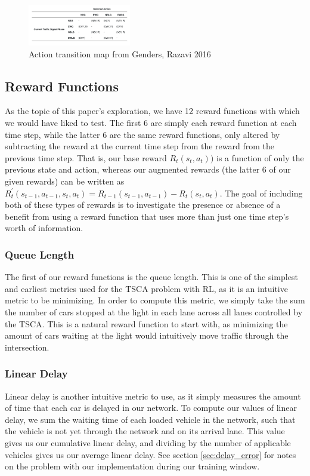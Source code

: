 \documentclass[12pt,twocolumn]{article}
\begin{document}
\begin{figure}
    \includegraphics[width=0.4\textwidth]{Figures/genders_actions}  
    \caption{Action transition map from Genders, Razavi 2016}
    \label{fig:action_transitions}
\end{figure}

\subsection{Reward Functions}
As the topic of this paper's exploration, we have 12 reward functions with which we would have liked to test. The first 6 are simply each reward function at each time step, while the latter 6 are the same reward functions, only altered by subtracting the reward at the current time step from the reward from the previous time step. That is, our base reward \(R_t(s_{t},a_{t}))\) is a function of only the previous state and action, whereas our augmented rewards (the latter 6 of our given rewards) can be written as \(R_t^{'}(s_{t-1},a_{t-1},s_t,a_t) = R_{t-1}(s_{t-1},a_{t-1}) - R_t(s_{t},a_{t})\). The goal of including both of these types of rewards is to investigate the presence or absence of a benefit from using a reward function that uses more than just one time step's worth of information.

\subsubsection{Queue Length}
The first of our reward functions is the queue length. This is one of the simplest and earliest metrics used for the TSCA problem with RL, as it is an intuitive metric to be minimizing. In order to compute this metric, we simply take the sum the number of cars stopped at the light in each lane across all lanes controlled by the TSCA. This is a natural reward function to start with, as minimizing the amount of cars waiting at the light would intuitively move traffic through the intersection.

\subsubsection{Linear Delay}
Linear delay is another intuitive metric to use, as it simply measures the amount of time that each car is delayed in our network. To compute our values of linear delay, we sum the waiting time of each loaded vehicle in the network, such that the vehicle is not yet through the network and on its arrival lane. This value gives us our cumulative linear delay, and dividing by the number of applicable vehicles gives us our average linear delay. See section \ref{sec:delay_error} for notes on the problem with our implementation during our training window.
\end{document}

